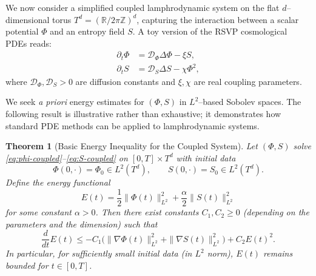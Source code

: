 \documentclass[12pt]{article}
\theoremstyle{plain}
\newtheorem{theorem}{Theorem}[section]
\theoremstyle{definition}
\theoremstyle{remark}
\begin{document}
We now consider a simplified coupled lamphrodynamic system on the flat
$d$--dimensional torus $T^d = (\mathbb{R}/2\pi\mathbb{Z})^d$, capturing the
interaction between a scalar potential $\Phi$ and an entropy field $S$.
A toy version of the RSVP cosmological PDEs reads:
\begin{align}
    \partial_t \Phi &= \mathcal{D}_\Phi \Delta \Phi - \xi S,
    \label{eq:phi-coupled} \\
    \partial_t S    &= \mathcal{D}_S \Delta S - \chi \Phi^2,
    \label{eq:S-coupled}
\end{align}
where $\mathcal{D}_\Phi,\mathcal{D}_S > 0$ are diffusion constants and
$\xi,\chi$ are real coupling parameters.

We seek \emph{a priori} energy estimates for $(\Phi,S)$ in $L^2$--based
Sobolev spaces. The following result is illustrative rather than exhaustive;
it demonstrates how standard PDE methods can be applied to lamphrodynamic
systems.

\begin{theorem}[Basic Energy Inequality for the Coupled System]
\label{thm:phi-S-energy}
Let $(\Phi,S)$ solve \eqref{eq:phi-coupled}--\eqref{eq:S-coupled} on
$[0,T]\times T^d$ with initial data
\[
    \Phi(0,\cdot) = \Phi_0 \in L^2(T^d),
    \qquad
    S(0,\cdot) = S_0 \in L^2(T^d).
\]
Define the energy functional
\[
    E(t)
    = \frac12 \|\Phi(t)\|_{L^2}^2
    + \frac{\alpha}{2}\|S(t)\|_{L^2}^2
\]
for some constant $\alpha>0$. Then there exist constants
$C_1, C_2 \ge 0$ (depending on the parameters and the dimension) such that
\begin{equation}
    \frac{d}{dt} E(t)
    \le - C_1 \big(
        \|\nabla \Phi(t)\|_{L^2}^2
        + \|\nabla S(t)\|_{L^2}^2
    \big)
    + C_2 E(t)^2.
    \label{eq:phi-S-energy-ineq}
\end{equation}
In particular, for sufficiently small initial data (in $L^2$ norm), $E(t)$
remains bounded for $t\in[0,T]$.
\end{theorem}
\end{document}
